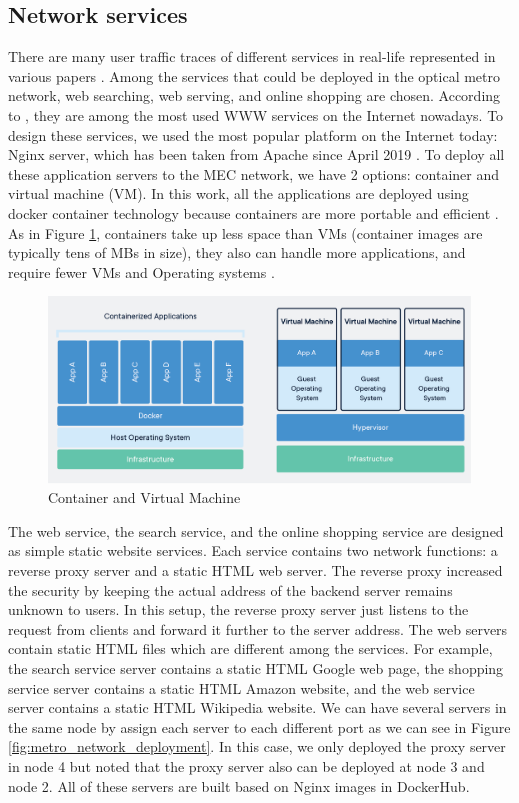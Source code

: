 \documentclass[conference]{IEEEtran}
\begin{document}
\subsection{Network services}
There are many user traffic traces of different services in real-life represented in various papers \cite{International2017, 7469991, Shi2016}. Among the services that could be deployed in the optical metro network, web searching, web serving, and online shopping are chosen. According to \cite{International2017}, they are among the most used WWW services on the Internet nowadays. To design these services, we used the most popular platform on the Internet today: Nginx server, which has been taken from Apache since April 2019 \cite{netcraft_news_2021}. To deploy all these application servers to the MEC network, we have 2 options: container and virtual machine (VM). In this work, all the applications are deployed using docker container technology because containers are more portable and efficient \cite{7036275}. As in Figure \ref{fig:container_img}, containers take up less space than VMs (container images are typically tens of MBs in size), they also can handle more applications, and require fewer VMs and Operating systems \cite{docker}.

\begin{figure}[]
    \centering
    \includegraphics[scale = 0.25]{imgs/container-VM.png}
    \caption{Container and Virtual Machine}
    \label{fig:container_img}
\end{figure}

The web service, the search service, and the online shopping service are designed as simple static website services. Each service contains two network functions: a reverse proxy server and a static HTML web server. The reverse proxy increased the security by keeping the actual address of the backend server remains unknown to users. In this setup, the reverse proxy server just listens to the request from clients and forward it further to the server address. The web servers contain static HTML files which are different among the services. For example, the search service server contains a static HTML Google web page, the shopping service server contains a static HTML Amazon website, and the web service server contains a static HTML Wikipedia website. We can have several servers in the same node by assign each server to each different port as we can see in Figure \ref{fig:metro_network_deployment}. In this case, we only deployed the proxy server in node 4 but noted that the proxy server also can be deployed at node 3 and node 2. All of these servers are built based on Nginx images in DockerHub.  
\end{document}
